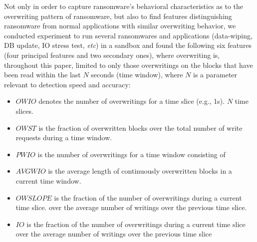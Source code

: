 \documentclass[conference]{IEEEtran}
\newcommand{\eg}{e.g.,\xspace}
\newcommand{\etc}{{\em etc}\xspace}
\begin{document}
Not only in order to capture ransomware's behavioral characteristics
as to the overwriting pattern of ransomware,
but also to find features distinguishing ransomware from normal applications with similar overwriting behavior,
we conducted experiment to run several ransomwares and applications 
(data-wiping, DB update, IO stress test, \etc) in a sandbox and found
the following six features (four principal features and two secondary ones), 
where overwriting is, throughout this paper, 
limited to only those overwritings on the blocks 
that have been read within the last $N$ seconds (time window), 
where $N$ is a parameter relevant to detection speed and accuracy:

\begin{itemize}
\item $OWIO$ denotes the number of overwritings for a time slice (\eg 1s). 
$N$ time slices.
\item $OWST$ is the fraction of overwritten blocks over the total number of write requests during a time window.
\item $PWIO$ is the number of overwritings for a time window consisting of 
\item $AVGWIO$ is the average length of continuously overwritten blocks in a current time window.
\item $OWSLOPE$ is the fraction of the number of overwritings during a current time slice.
over the average number of writings over the previous time slice.
\item $IO$ is the fraction of the number of overwritings during a current time slice 
over the average number of writings over the previous time slice
\end{itemize}
\end{document}

